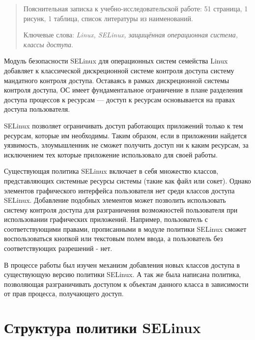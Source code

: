 \documentclass{./../class/UIR}
\begin{document}
\maketitle
\begin{abstract}
Пояснительная записка к учебно-исследовательской работе: 51 страница, 1 
рисунк, 1 таблица, список литературы из  наименований.

Ключевые слова: \textit{Linux, SELinux, защищённая операционная система,
классы доступа}.

\end{abstract}

\tableofcontents
{}
	Модуль безопасности SELinux для операционных систем семейства Linux добавляет к
	классической дискреционной системе контроля доступа систему мандатного
	контроля доступа. Оставаясь в рамках дискреционной системы контроля доступа, ОС
	имеет фундаментальное ограничение в плане разделения доступа процессов к
	ресурсам — доступ к ресурсам основывается на правах доступа пользователя.

	SELinux позволяет ограничивать доступ работающих приложений только к
	тем ресурсам, которые им необходимы. Таким образом, если в
	приложении найдется уязвимость, злоумышленник не сможет получить
	доступ ни к каким ресурсам, за исключением тех которые приложение
	использовало для своей работы.

	Существующая политика SELinux включает в себя множество классов, представляющих
	системные ресурсы системы (такие как файл или сокет). Однако элементов
	графического интерфейса пользователя нет среди классов доступа SELinux.
	Добавление подобных элементов может позволить использовать систему контроля
	доступа для разграничения возможностей пользователя при использовании
	графических приложений. Например, пользователь с соответствующими правами,
	прописанными в модуле политики SELinux сможет воспользоваться кнопкой или
	текстовым полем ввода, а пользователь без соответствующих разрешений - нет.

	В процессе работы был изучен механизм добавления новых классов доступа в
	существующую версию политики SELinux. А так же была написана политика,
	позволяющая разграничивать доступом к объектам данного класса в зависимости от
	прав процесса, получающего доступ.


\section{Структура политики SELinux}	
\end{document}
